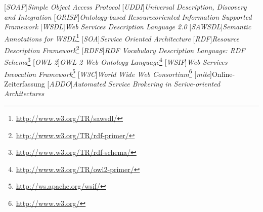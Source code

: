 
[\emph{SOAP}]{\emph{Simple Object Access Protocol}}
[\emph{UDDI}]{\emph{Universal Description, Discovery and Integration}}
[\emph{ORISF}]{\emph{Ontology-based Resourceoriented Information Supported Framework}}
[\emph{WSDL}]{\emph{Web Services Description Language 2.0}}
[\emph{SAWSDL}]{\emph{Semantic Annotations for WSDL}\footnote{\url{http://www.w3.org/TR/sawsdl/}}}
[\emph{SOA}]{\emph{Service Oriented Architecture}}
[\emph{RDF}]{\emph{Resource Description Framework}\footnote{\url{http://www.w3.org/TR/rdf-primer/}}}
[\emph{RDFS}]{\emph{RDF Vocabulary Description Language: RDF Schema}\footnote{\url{http://www.w3.org/TR/rdf-schema/}}}
[\emph{OWL 2}]{\emph{OWL 2 Web Ontology Language}\footnote{\url{http://www.w3.org/TR/owl2-primer/}}}
[\emph{WSIF}]{\emph{Web Services Invocation Framework}\footnote{\url{http://ws.apache.org/wsif/}}}
[\emph{W3C}]{\emph{World Wide Web Consortium}\footnote{\url{http://www.w3.org/}}}
[\emph{mite}]{Online-Zeiterfassung}
[\emph{ADDO}]{\emph{Automated Service Brokering in Serive-oriented Architectures}}
